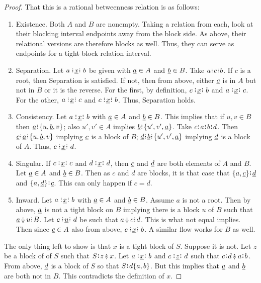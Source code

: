 \documentclass[12pt]{article}
\begin{document}
\begin{proof}
That this is a rational betweenness relation is as follows: 
\begin{enumerate}
    \item Existence. Both $A$ and $B$ are nonempty. Taking a relation from each, look at their blocking interval endpoints away from the block side. As above, their relational versions are therefore blocks as well. Thus, they can serve as endpoints for a tight block relation interval. 
    \item Separation. Let $a \xrel b$ be given with $\underline{a} \in A$ and $\underline{b} \in B$. Take $a \rint c \rint b$. If $c$ is a root, then Separation is satisfied. If not, then from above, either $\underline{c}$ is in $A$ but not in $B$ or it is the reverse. For the first, by definition, $c \xrel b$ and \sout{$a \xrel c$}. For the other, $a \xrel c$ and \sout{$c \xrel b$}. Thus, Separation holds. 
    \item Consistency. Let $a \xrel b$ with $\underline{a} \in A$ and $\underline{b} \in B$. This implies that if $u, v \in B$ then $\qrel{a} \rint \{u, \qrel{b}, v\}$; also $u', v' \in A$ implies $\qrel{b} \rint \{u', v', \qrel{a}\}$. Take $c \rint a \rint b \rint d$. Then $ \qrel{c}\rint \qrel{a} \rint \{u, \qrel{b}, v\}$  implying $\underline{c}$ is a block of $B$;  $\qrel{d} \rint \qrel{b} \rint \{u', v', \qrel{a}\}$ implying $\underline{d}$ is a block of $A$. Thus, $c \xrel d$.
    \item Singular. If $c \xrel c$ and $d \xrel d$, then $\underline{c}$ and $\underline{d}$ are both elements of $A$ and $B$. Let $\underline{a} \in A$ and $\underline{b} \in B$. Then as $c$ and $d$ are blocks, it is that case that $\{a, \qrel{c}\} \rint \qrel{d}$ and $\{a, \qrel{d}\} \rint \qrel{c}$. This can only happen if $c = d$. 
    \item Inward.  Let $a \xrel b$ with $\underline{a} \in A$ and $\underline{b} \in B$. Assume $a$ is not a root. Then by above, $\underline{a}$ is not a tight block on $B$ implying there is a block $u$ of $B$ such that $\qrel{a} \betneq u \rint B$. Let $c \xrel[u] d$ be such that $a \betneq c \rint d$. This is what not equal implies. Then since $\underline{c} \in A$ also from above, $c \xrel b$. A similar flow works for $B$ as well. 
    
\end{enumerate}

The only thing left to show is that $x$ is a tight block of $S$. Suppose it is not. Let $z$ be a block of of $S$ such that $S \rint z \betneq x$. Let $a \xrel b$ and $c \xrel[z] d$ such that $c \rint d \betneq a \rint b$. From above, $\underline{d}$ is a block of $S$ so that $S \rint d \{a, b\}$. But this implies that $\underline{a}$ and $\underline{b}$ are both not in $B$. This contradicts the definition of $x$. 
    
\end{proof}
\end{document}
